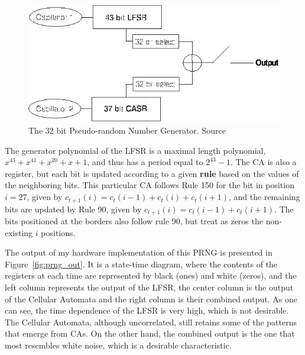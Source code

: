 \begin{figure}
    \centering
    \includegraphics[width=\linewidth]{figures/prng.eps}
    \caption[The 32 bit Pseudo-random Number Generator. Source~\cite{Tkacik2003}]{The 32 bit Pseudo-random Number Generator. Source~\cite{Tkacik2003}}
    \label{fig:prng}
\end{figure}
The generator polynomial of the LFSR is a maximal length polynomial, $x^{43}+x^{41}+x^{20}+x+1$, and thus has a period equal to $2^{43}-1$. The CA is also a register, but each bit is updated
according to a given \textbf{rule} based on the values of the neighboring bits. This particular CA follows Rule 150 for the bit in position $i=27$, given by $c_{t+1}(i) = c_{t}(i-1) + c_{t}(i) + c_{t}(i+1)$, and
the remaining bits are updated by Rule 90, given by $c_{t+1}(i) = c_{t}(i-1) + c_{t}(i+1)$. The bits positioned at the borders also follow rule 90, but treat as zeros the non-existing $i$ positions.

The output of my hardware implementation of this PRNG is presented in Figure~\ref{fig:prng_out}. It is a state-time diagram, where the contents of the registers at each time are represented by black (ones) and white (zeros), and the left column represents the output of the LFSR, the center column is the output of the Cellular Automata and the right column is their combined output. As one can see, the time dependence of the LFSR is very high, which is not desirable. The Cellular Automata, although uncorrelated, still retains some of the patterns that emerge from CAs. On the other hand, the combined output is the one that most resembles white noise, which is a desirable characteristic.

